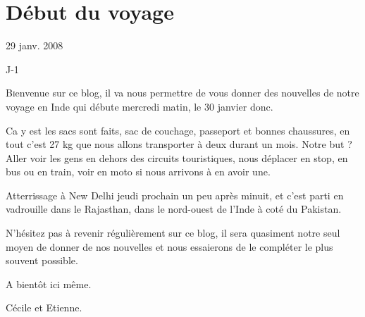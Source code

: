 \section{Début du voyage}

29 janv. 2008

\begin{multicols}{2}

J-1

\lettrine[findent=.3em]{B}ienvenue sur ce blog, il va nous permettre de vous donner des nouvelles de notre voyage en Inde qui débute mercredi matin, le 30 janvier donc.

Ca y est les sacs sont faits, sac de couchage, passeport et bonnes chaussures, en tout c'est 27 kg que nous allons transporter à deux durant un mois. Notre but ? Aller voir les gens en dehors des circuits touristiques, nous déplacer en stop, en bus ou en train, voir en moto si nous arrivons à en avoir une.

Atterrissage à New Delhi jeudi prochain un peu après minuit, et c'est parti en vadrouille dans le Rajasthan, dans le nord-ouest de l'Inde à coté du Pakistan.

N'hésitez pas à revenir régulièrement sur ce blog, il sera quasiment notre seul moyen de donner de nos nouvelles et nous essaierons de le compléter le plus souvent possible.

A bientôt ici même.

Cécile et Etienne.

\end{multicols}


